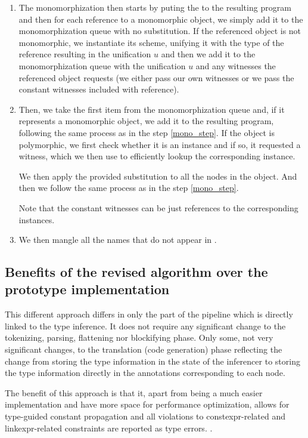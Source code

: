 \begin{enumerate}
    \item The monomorphization then starts by puting the  to the resulting program and then for each reference to a monomorphic object, we simply add it to the monomorphization queue with no substitution. If the referenced object is not monomorphic, we instantiate its scheme, unifying it with the type of the reference resulting in the unification $u$ and then we add it to the monomorphization queue with the unification $u$ and any witnesses the referenced object requests (we either pass our own witnesses or we pass the constant witnesses included with reference). \label{mono_step}

    \item Then, we take the first item from the monomorphization queue and, if it represents a monomorphic object, we add it to the resulting program, following the same process as in the step \ref{mono_step}. If the object is polymorphic, we first check whether it is an instance and if so, it requested a witness, which we then use to efficiently lookup the corresponding instance.

    We then apply the provided substitution to all the nodes in the object. And then we follow the same process as in the step \ref{mono_step}.

    Note that the constant witnesses can be just references to the corresponding instances.

    \item We then mangle all the names that do not appear in .
\end{enumerate}

\subsection{Benefits of the revised algorithm over the prototype implementation}

This different approach differs in only the part of the pipeline which is directly linked to the type inference. It does not require any significant change to the tokenizing, parsing, flattening nor blockifying phase. Only some, not very significant changes, to the translation (code generation) phase reflecting the change from storing the type information in the state of the inferencer to storing the type information directly in the annotations corresponding to each node.

The benefit of this approach is that it, apart from being a much easier implementation and have more space for performance optimization, allows for type-guided constant propagation and all violations to constexpr-related and linkexpr-related constraints are reported as type errors. .

